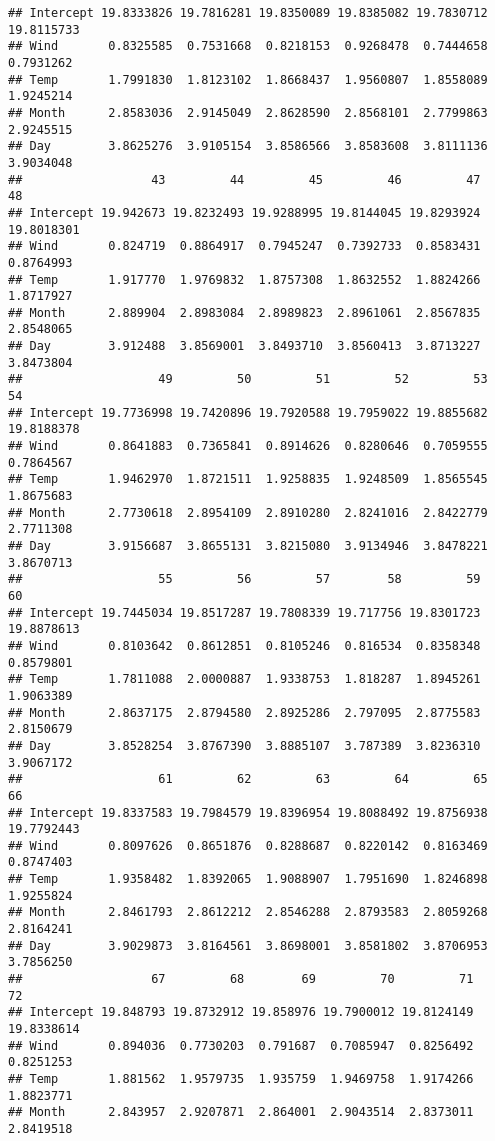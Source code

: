 \documentclass[
]{article}
\begin{document}
\begin{verbatim}
## Intercept 19.8333826 19.7816281 19.8350089 19.8385082 19.7830712 19.8115733
## Wind       0.8325585  0.7531668  0.8218153  0.9268478  0.7444658  0.7931262
## Temp       1.7991830  1.8123102  1.8668437  1.9560807  1.8558089  1.9245214
## Month      2.8583036  2.9145049  2.8628590  2.8568101  2.7799863  2.9245515
## Day        3.8625276  3.9105154  3.8586566  3.8583608  3.8111136  3.9034048
##                  43         44         45         46         47         48
## Intercept 19.942673 19.8232493 19.9288995 19.8144045 19.8293924 19.8018301
## Wind       0.824719  0.8864917  0.7945247  0.7392733  0.8583431  0.8764993
## Temp       1.917770  1.9769832  1.8757308  1.8632552  1.8824266  1.8717927
## Month      2.889904  2.8983084  2.8989823  2.8961061  2.8567835  2.8548065
## Day        3.912488  3.8569001  3.8493710  3.8560413  3.8713227  3.8473804
##                   49         50         51         52         53         54
## Intercept 19.7736998 19.7420896 19.7920588 19.7959022 19.8855682 19.8188378
## Wind       0.8641883  0.7365841  0.8914626  0.8280646  0.7059555  0.7864567
## Temp       1.9462970  1.8721511  1.9258835  1.9248509  1.8565545  1.8675683
## Month      2.7730618  2.8954109  2.8910280  2.8241016  2.8422779  2.7711308
## Day        3.9156687  3.8655131  3.8215080  3.9134946  3.8478221  3.8670713
##                   55         56         57        58         59         60
## Intercept 19.7445034 19.8517287 19.7808339 19.717756 19.8301723 19.8878613
## Wind       0.8103642  0.8612851  0.8105246  0.816534  0.8358348  0.8579801
## Temp       1.7811088  2.0000887  1.9338753  1.818287  1.8945261  1.9063389
## Month      2.8637175  2.8794580  2.8925286  2.797095  2.8775583  2.8150679
## Day        3.8528254  3.8767390  3.8885107  3.787389  3.8236310  3.9067172
##                   61         62         63         64         65         66
## Intercept 19.8337583 19.7984579 19.8396954 19.8088492 19.8756938 19.7792443
## Wind       0.8097626  0.8651876  0.8288687  0.8220142  0.8163469  0.8747403
## Temp       1.9358482  1.8392065  1.9088907  1.7951690  1.8246898  1.9255824
## Month      2.8461793  2.8612212  2.8546288  2.8793583  2.8059268  2.8164241
## Day        3.9029873  3.8164561  3.8698001  3.8581802  3.8706953  3.7856250
##                  67         68        69         70         71         72
## Intercept 19.848793 19.8732912 19.858976 19.7900012 19.8124149 19.8338614
## Wind       0.894036  0.7730203  0.791687  0.7085947  0.8256492  0.8251253
## Temp       1.881562  1.9579735  1.935759  1.9469758  1.9174266  1.8823771
## Month      2.843957  2.9207871  2.864001  2.9043514  2.8373011  2.8419518

\end{verbatim}
\end{document}
